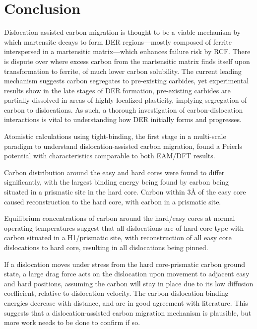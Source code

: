 \documentclass[a4paper,12pt,oneside,print,numbered,index,PageStyleIII]{PhDThesisPSnPDF}
\begin{document}
\section{Conclusion}
\label{sec:org998cefd}

Dislocation-assisted carbon migration is thought to be a viable mechanism by which martensite
decays to form DER regions---mostly composed of ferrite interspersed in a martensitic
matrix---which enhances failure risk by RCF. There is dispute over where excess carbon from the
martensitic matrix finds itself upon transformation to ferrite, of much lower carbon
solubility. The current leading mechanism suggests carbon segregates to pre-existing carbides, yet
experimental results show in the late stages of DER formation, pre-existing carbides are partially
dissolved in areas of highly localized plasticity, implying segregation of carbon to
dislocations. As such, a thorough investigation of carbon-dislocation interactions is vital to
understanding how DER initially forms and progresses.

Atomistic calculations using tight-binding, the first stage in a multi-scale paradigm to
understand dislocation-assisted carbon migration, found a Peierls potential with characteristics
comparable to both EAM/DFT results.

Carbon distribution around the easy and hard cores were found to differ
significantly, with the largest binding energy being found by carbon being situated in a prismatic
site in the hard core. Carbon within 3\AA{} of the easy core caused reconstruction to the hard core,
with carbon in a prismatic site.

Equilibrium concentrations of carbon around the hard/easy cores at normal operating temperatures
suggest that all dislocations are of hard core type with carbon situated in a H1/prismatic site, with
reconstruction of all easy core dislocations to hard core, resulting in all dislocations being
pinned.

If a dislocation moves under stress from the hard core-prismatic carbon ground state, a large drag
force acts on the dislocation upon movement to adjacent easy and hard positions, assuming the carbon
will stay in place due to its low diffusion coefficient, relative to dislocation velocity. The
carbon-dislocation binding energies decrease with distance, and are in good agreement with
literature. This suggests that a dislocation-assisted carbon migration mechanism is plausible, but
more work needs to be done to confirm if so.
\end{document}
